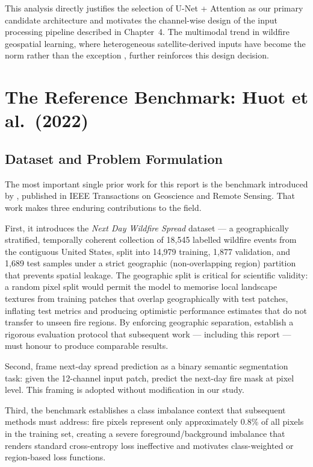 This analysis directly justifies the selection of U-Net + Attention as our primary candidate architecture and motivates the channel-wise design of the input processing pipeline described in Chapter~4.
The multimodal trend in wildfire geospatial learning, where heterogeneous satellite-derived inputs have become the norm rather than the exception \citep{dlwildfirerisk2025}, further reinforces this design decision.

\section{The Reference Benchmark: Huot et al.\ (2022)}
\label{sec:sota_huot}

\subsection{Dataset and Problem Formulation}

The most important single prior work for this report is the benchmark introduced by \citet{huot2022next}, published in IEEE Transactions on Geoscience and Remote Sensing.
That work makes three enduring contributions to the field.

First, it introduces the \textit{Next Day Wildfire Spread} dataset — a geographically stratified, temporally coherent collection of 18,545 labelled wildfire events from the contiguous United States, split into 14,979 training, 1,877 validation, and 1,689 test samples under a strict geographic (non-overlapping region) partition that prevents spatial leakage.
The geographic split is critical for scientific validity: a random pixel split would permit the model to memorise local landscape textures from training patches that overlap geographically with test patches, inflating test metrics and producing optimistic performance estimates that do not transfer to unseen fire regions.
By enforcing geographic separation, \citet{huot2022next} establish a rigorous evaluation protocol that subsequent work — including this report — must honour to produce comparable results.

Second, \citet{huot2022next} frame next-day spread prediction as a binary semantic segmentation task: given the 12-channel input patch, predict the next-day fire mask at pixel level.
This framing is adopted without modification in our study.

Third, the benchmark establishes a class imbalance context that subsequent methods must address: fire pixels represent only approximately 0.8\% of all pixels in the training set, creating a severe foreground/background imbalance that renders standard cross-entropy loss ineffective and motivates class-weighted or region-based loss functions.

